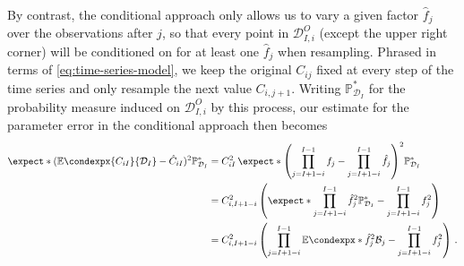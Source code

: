 \documentclass[a4paper]{book}
\theoremstyle{plain}
\newcommand{\condexp}{\mathbb{E}\condexpx}
\begin{document}
By contrast, the conditional approach only allows us to vary a given factor $\hat{f}_j$ over the observations after $j$, so that every point in $\mathcal{D}^O_{I, i}$ (except the upper right corner) will be conditioned on for at least one $\hat{f}_j$ when resampling. Phrased in terms of \eqref{eq:time-series-model}, we keep the original $C_{ij}$ fixed at every step of the time series and only resample the next value $C_{i, j+1}$. Writing $\mathbb{P}^*_{\mathcal{D}_I}$ for the probability measure induced on $\mathcal{D}^O_{I, i}$ by this process, our estimate for the parameter error in the conditional approach then becomes
\begin{align}
    \expect*{(\condexp{C_{iI}}{\mathcal{D}_I} - \hat{C}_{iI})^2}{\mathbb{P}^*_{\mathcal{D}_I}}&= C^2_{iI} \, \expect*{\left( \prod_{j=I+1-i}^{I-1}f_j - \prod_{j=I+1-i}^{I-1}\hat{f}_j \right)^2}{\mathbb{P}^*_{\mathcal{D}_I}} \\ 
    &= C^2_{i, I+1-i} \left( \expect*{\prod_{j=I+1-i}^{I-1}\hat{f}^2_j}{\mathbb{P}^*_{\mathcal{D}_I}} - \prod_{j=I+1-i}^{I-1}f^2_j \right) \\
    &= C^2_{i, I+1-i} \left( \prod_{j=I+1-i}^{I-1} \condexp*{\hat{f}^2_j}{\mathcal{B}_j} - \prod_{j=I+1-i}^{I-1}f^2_j \right) \,.
\end{align}
\end{document}
